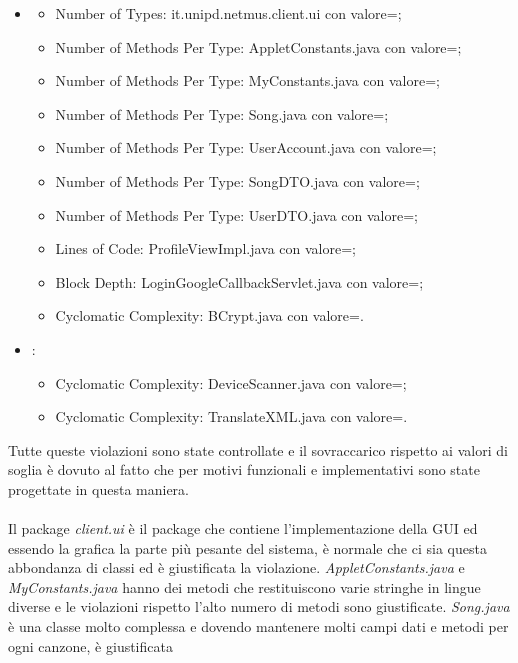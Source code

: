 \begin{itemize}
     \item {}
  \begin{itemize}
  \item Number of Types: it.unipd.netmus.client.ui con valore=;
  \item Number of Methods Per Type: AppletConstants.java con valore=;
  \item Number of Methods Per Type: MyConstants.java con valore=;
  \item Number of Methods Per Type: Song.java con valore=;
  \item Number of Methods Per Type: UserAccount.java con valore=;
  \item Number of Methods Per Type: SongDTO.java con valore=;
  \item Number of Methods Per Type: UserDTO.java con valore=;
  \item Lines of Code: ProfileViewImpl.java con valore=;
  \item Block Depth: LoginGoogleCallbackServlet.java con valore=;
  \item Cyclomatic Complexity: BCrypt.java con valore=.
  \end{itemize}
    \item {}:
  \begin{itemize}
  \item Cyclomatic Complexity: DeviceScanner.java con valore=;
  \item Cyclomatic Complexity: TranslateXML.java con valore=.
  \end{itemize}
\end{itemize}
Tutte queste violazioni sono state controllate e il sovraccarico rispetto ai
valori di soglia \`e dovuto al fatto che per motivi funzionali e
implementativi sono state progettate in questa maniera. 
\\\\
Il package
\emph{client.ui} \`e il package che contiene l'implementazione della GUI ed
essendo la grafica la parte pi\`u pesante del sistema, \`e normale che ci
sia questa abbondanza di classi ed \`e giustificata la violazione. \emph{AppletConstants.java} e \emph{MyConstants.java} hanno dei metodi che
restituiscono varie stringhe in lingue diverse e le violazioni rispetto l'alto numero di
metodi sono giustificate. \emph{Song.java} \`e una classe molto complessa e
dovendo mantenere molti campi dati e metodi per ogni canzone, \`e giustificata
